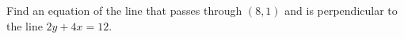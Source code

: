 Find an equation of the line that passes through $(8,1)$ and is perpendicular to the line $2y+4x=12$.
